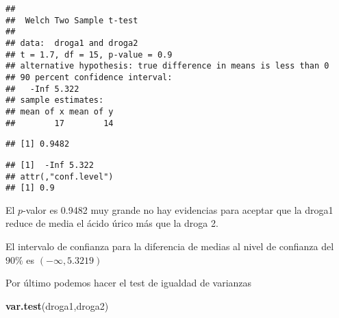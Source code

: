 \documentclass[
]{article}
\newenvironment{Shaded}{\begin{snugshade}}{\end{snugshade}}
\newcommand{\DataTypeTok}[1]{\textcolor[rgb]{0.13,0.29,0.53}{#1}}
\newcommand{\FloatTok}[1]{\textcolor[rgb]{0.00,0.00,0.81}{#1}}
\newcommand{\KeywordTok}[1]{\textcolor[rgb]{0.13,0.29,0.53}{\textbf{#1}}}
\newcommand{\NormalTok}[1]{#1}
\newcommand{\OperatorTok}[1]{\textcolor[rgb]{0.81,0.36,0.00}{\textbf{#1}}}
\newcommand{\OtherTok}[1]{\textcolor[rgb]{0.56,0.35,0.01}{#1}}
\newcommand{\StringTok}[1]{\textcolor[rgb]{0.31,0.60,0.02}{#1}}
\begin{document}
\begin{verbatim}
## 
##  Welch Two Sample t-test
## 
## data:  droga1 and droga2
## t = 1.7, df = 15, p-value = 0.9
## alternative hypothesis: true difference in means is less than 0
## 90 percent confidence interval:
##   -Inf 5.322
## sample estimates:
## mean of x mean of y 
##        17        14
\end{verbatim}

\begin{Shaded}
\end{Shaded}

\begin{verbatim}
## [1] 0.9482
\end{verbatim}

\begin{Shaded}
\end{Shaded}

\begin{verbatim}
## [1]  -Inf 5.322
## attr(,"conf.level")
## [1] 0.9
\end{verbatim}

El \(p\)-valor es 0.9482 muy grande no hay evidencias para aceptar que
la droga1 reduce de media el ácido úrico más que la droga 2.

El intervalo de confianza para la diferencia de medias al nivel de
confianza del \(90\%\) es \((-\infty, 5.3219)\)

Por último podemos hacer el test de igualdad de varianzas

\begin{Shaded}
\begin{Highlighting}[]
\KeywordTok{var.test}\NormalTok{(droga1,droga2)}
\end{Highlighting}
\end{Shaded}
\end{document}

